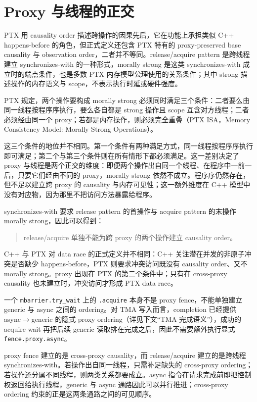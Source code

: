 \section{Proxy 与线程的正交}

PTX 用 causality order 描述跨操作的因果先后，它在功能上承担类似 C++ happens-before 的角色，但正式定义还包含 PTX 特有的 proxy-preserved base causality 与 observation order，二者并不等同。release/acquire pattern 是跨线程建立 synchronizes-with 的一种形式，morally strong 是这类 synchronizes-with 成立时的端点条件，也是多数 PTX 内存模型公理使用的关系条件；其中 strong 描述操作的内存语义与 scope，不表示执行时延或硬件强度。

PTX 规定，两个操作要构成 morally strong 必须同时满足三个条件：二者要么由同一线程按程序序执行，要么各自都是 strong 操作且 scope 互含对方线程；二者必须经由同一个 proxy；若都是内存操作，则必须完全重叠（PTX ISA，Memory Consistency Model: Morally Strong Operations）。

这三个条件的地位并不相同。第一个条件有两种满足方式，同一线程按程序序执行即可满足；第二个与第三个条件则在所有情形下都必须满足。这一差别决定了 proxy 与线程是两个正交的维度：即便两个操作出自同一个线程、在程序中一前一后，只要它们经由不同的 proxy，morally strong 依然不成立。程序序仍然存在，但不足以建立跨 proxy 的 causality 与内存可见性；这一额外维度在 C++ 模型中没有对应物，因为那里不把访问方法暴露给程序。

synchronizes-with 要求 release pattern 的首操作与 acquire pattern 的末操作 morally strong，因此可以得到：

\begin{quote}
release/acquire 单独不能为跨 proxy 的两个操作建立 causality order。
\end{quote}

C++ 与 PTX 对 data race 的正式定义并不相同：C++ 关注潜在并发的非原子冲突是否缺少 happens-before，PTX 则要求冲突访问既没有 causality order、又不 morally strong。proxy 出现在 PTX 的第二个条件中；只有在 cross-proxy causality 也未建立时，冲突访问才形成 PTX data race。

一个 \lstinline|mbarrier.try_wait| 上的 \lstinline|.acquire| 本身不是 proxy fence，不能单独建立 generic 与 async 之间的 ordering。对 TMA 写入而言，completion 已经提供 async$\rightarrow$generic 的隐式 proxy ordering（详见下文“TMA 完成语义”），成功的 acquire wait 再把后续 generic 读取排在完成之后，因此不需要额外执行显式 \lstinline|fence.proxy.async|。

proxy fence 建立的是 cross-proxy causality，而 release/acquire 建立的是跨线程 synchronizes-with。若操作出自同一线程，只需补足缺失的 cross-proxy ordering；若操作还分属不同线程，则两类关系都要成立。async 指令在请求完成前即把控制权返回给执行线程，generic 与 async 通路因此可以并行推进；cross-proxy ordering 约束的正是这两条通路之间的可见顺序。

